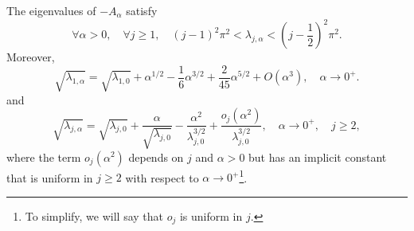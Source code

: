 \documentclass[10pt,a4paper]{amsart}
\begin{document}
\begin{Lemma}\label{lem:spectral_asymp}
The eigenvalues of $-A_\alpha$ satisfy 
\begin{equation}\label{eq:spectral_genuine}
\forall \alpha > 0,\quad \forall j \geq 1,\quad (j-1)^2\pi^2 < \lambda_{j,\alpha} < \left( j - \frac{1}{2}\right)^2 \pi^2.
\end{equation}
Moreover,
\[
 \sqrt{\lambda_{1,\alpha}} = \sqrt{\lambda_{1,0}} + \alpha^{1/2} - \frac{1}{6} \alpha^{3/2} + \frac{2}{45} \alpha^{5/2} +  O(\alpha^3),\quad \alpha \to 0^+.
 \]
and 
\[
\sqrt{\lambda_{j,\alpha}} = \sqrt{\lambda_{j,0}} + \frac{\alpha}{\sqrt{\lambda_{j,0}}} - \frac{\alpha^2}{\lambda_{j,0}^{3/2}} + \frac{o_j(\alpha^2)}{\lambda_{j,0}^{3/2}}, \quad \alpha \to 0^+,\quad j \geq 2,
\]
where the term $o_j(\alpha^2)$ depends on $j$ and $\alpha > 0$ but has an implicit constant that is uniform in $j \geq 2$ with respect to $\alpha \to 0^+$\footnote{To simplify, we will say that $o_j$ is uniform in $j$.}. 
\end{Lemma}
\end{document}
